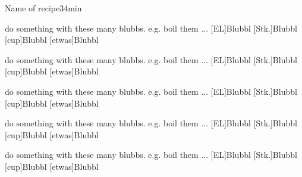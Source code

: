 \documentclass[ngerman,parskip=full]{article}
\begin{document}
\begin{recipe}{Name of recipe}{3}{4min}
  \begin{step}{do something with these many blubbs. e.g. boil them ...}
    [EL]{Blubbl}
    [Stk.]{Blubbl}
    [cup]{Blubbl}
    [etwas]{Blubbl}
  \end{step}
  \begin{step}{do something with these many blubbs. e.g. boil them ...}
    [EL]{Blubbl}
    [Stk.]{Blubbl}
    [cup]{Blubbl}
    [etwas]{Blubbl}
  \end{step}
  \begin{step}{do something with these many blubbs. e.g. boil them ...}
    [EL]{Blubbl}
    [Stk.]{Blubbl}
    [cup]{Blubbl}
    [etwas]{Blubbl}
  \end{step}
  \begin{step}{do something with these many blubbs. e.g. boil them ...}
    [EL]{Blubbl}
    [Stk.]{Blubbl}
    [cup]{Blubbl}
    [etwas]{Blubbl}
  \end{step}
  \begin{step}{do something with these many blubbs. e.g. boil them ...}
    [EL]{Blubbl}
    [Stk.]{Blubbl}
    [cup]{Blubbl}
    [etwas]{Blubbl}
  \end{step}
\end{recipe}


\end{document}
